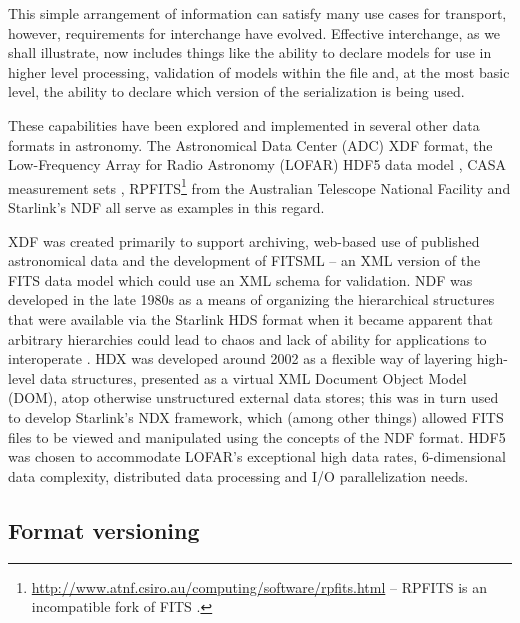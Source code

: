 \documentclass[final,authoryear,5p,times,twocolumn]{elsarticle}
\begin{document}
{{This simple arrangement of information can satisfy many use cases for
transport, however, requirements for interchange have evolved. Effective
interchange, as we shall illustrate, now includes things like the ability to
declare models for use in higher level processing, validation of models within
the file and, at the most basic level, the ability to declare which version of
the serialization is being used.


These capabilities have been explored and implemented in several other data formats in astronomy.
The Astronomical Data Center (ADC) XDF
format, the Low-Frequency Array for Radio Astronomy (LOFAR) HDF5 data
model \citep{2012ASPC..461..283A}, CASA measurement sets
\citep{2012ASPC..461..849P},
RPFITS\footnote{\url{http://www.atnf.csiro.au/computing/software/rpfits.html}
-- RPFITS is an incompatible fork of FITS \citep[see e.g.,][]{1998ASPC..145...32B}.} from the Australian Telescope
National Facility
and Starlink's NDF
\citep{1988STARB...2...11C,1993ASPC...52..229W,P91_adassxxiii} all
serve as examples in this regard.

XDF was created primarily to support archiving, web-based use of
published astronomical data and the development of FITSML -- an XML version
of the FITS data model which could use an XML schema for validation.
NDF was developed in the late
1980s as a means of organizing the hierarchical structures that were
available via the Starlink HDS format when it became apparent that
arbitrary hierarchies could lead to chaos and lack of ability for
applications to interoperate \citep{2015Jenness}.
HDX \citep{2003ASPC..295..221G} was developed around 2002 as a flexible
way of layering high-level data structures, presented as a virtual XML
Document Object Model (DOM), atop otherwise unstructured external data stores; this was in
turn used to develop Starlink's NDX framework, which (among other
things) allowed FITS files to be viewed and manipulated using the
concepts of the NDF format.
HDF5 \citep{2012ASPC..461..283A} was chosen to accommodate LOFAR's
exceptional high data rates, 6-dimensional data complexity, distributed
data processing and I/O parallelization needs.



\subsection{Format versioning}
\label{subsection_format_versioning}

}}
\end{document}
